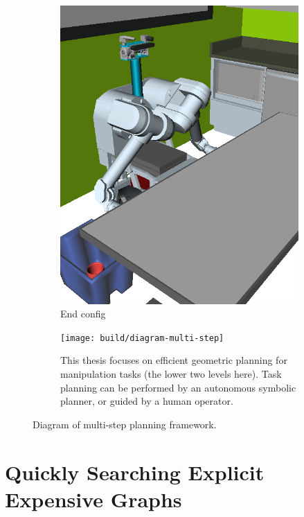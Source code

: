 {\begin{figure}
\begin{widepage}
\begin{subfigure}[t]{0.19\linewidth}
      \includegraphics[width=\columnwidth]{figs/testherb-e.png}
      \caption{End config}
   \end{subfigure}

   \vspace{0.3cm}

   \begin{subfigure}[t]{\linewidth}
      \centering
      \texttt{[image: build/diagram-multi-step]}
      \caption{This thesis focuses on efficient geometric planning
         for manipulation tasks (the lower two levels here).
         Task planning can be performed by an autonomous
         symbolic planner,
         or guided by a human operator.}
   \end{subfigure}

   \caption{Diagram of multi-step planning framework.}
   \label{fig:xx-diagram-multi-step}
\end{widepage}
\end{figure}
}

\section{Quickly Searching Explicit Expensive Graphs}
\label{chap:e8}

